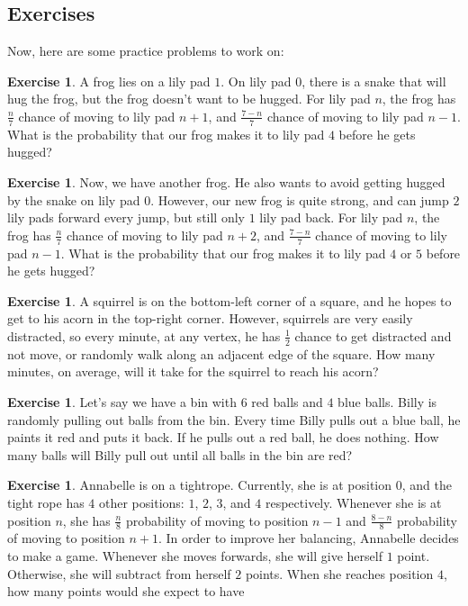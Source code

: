 \documentclass[letterpaper]{article}
\theoremstyle{definition}
\theoremstyle{remark}
\theoremstyle{definition}
\newtheorem{exercise}[thm]{Exercise}
\begin{document}
\subsection*{Exercises}
Now, here are some practice problems to work on:

\begin{exercise}
    A frog lies on a lily pad $1$. On lily pad $0$, there is a snake that will hug the frog, but the frog doesn't want to be hugged. For lily pad $n$, the frog has $\frac{n}{7}$ chance of moving to lily pad $n+1$, and $\frac{7-n}{7}$ chance of moving to lily pad $n-1$. What is the probability that our frog makes it to lily pad $4$ before he gets hugged?
\end{exercise}

\begin{exercise}
    Now, we have another frog. He also wants to avoid getting hugged by the snake on lily pad $0$. However, our new frog is quite strong, and can jump $2$ lily pads forward every jump, but still only $1$ lily pad back. For lily pad $n$, the frog has $\frac{n}{7}$ chance of moving to lily pad $n+2$, and $\frac{7-n}{7}$ chance of moving to lily pad $n-1$. What is the probability that our frog makes it to lily pad $4$ or $5$ before he gets hugged?
\end{exercise}

\begin{exercise}
    A squirrel is on the bottom-left corner of a square, and he hopes to get to his acorn in the top-right corner. However, squirrels are very easily distracted, so every minute, at any vertex, he has $\frac{1}{2}$ chance to get distracted and not move, or randomly walk along an adjacent edge of the square. How many minutes, on average, will it take for the squirrel to reach his acorn?
\end{exercise}

\begin{exercise}
    Let's say we have a bin with $6$ red balls and $4$ blue balls. Billy is randomly pulling out balls from the bin. Every time Billy pulls out a blue ball, he paints it red and puts it back. If he pulls out a red ball, he does nothing. How many balls will Billy pull out until all balls in the bin are red?
\end{exercise}

\begin{exercise}
    Annabelle is on a tightrope. Currently, she is at position $0$, and the tight rope has $4$ other positions: $1$, $2$, $3$, and $4$ respectively. Whenever she is at position $n$, she has $\frac{n}{8}$ probability of moving to position $n-1$ and $\frac{8-n}{8}$ probability of moving to position $n+1$. In order to improve her balancing, Annabelle decides to make a game. Whenever she moves forwards, she will give herself $1$ point. Otherwise, she will subtract from herself $2$ points. When she reaches position $4$, how many points would she expect to have
\end{exercise}
\end{document}

